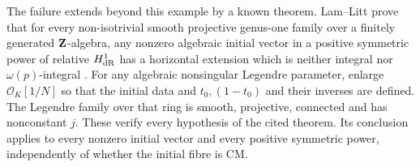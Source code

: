 \documentclass[11pt]{article}
\theoremstyle{definition}\newtheorem{definition}[theorem]{Definition}
\theoremstyle{remark}\newtheorem{remark}[theorem]{Remark}
\begin{document}
The failure extends beyond this example by a known theorem. Lam--Litt prove that for every non-isotrivial smooth projective genus-one family over a finitely generated $\mathbf Z$-algebra, any nonzero algebraic initial vector in a positive symmetric power of relative $H^1_{\mathrm{dR}}$ has a horizontal extension which is neither integral nor $\omega(p)$-integral \cite[Theorem 4.1.1, p.~21]{LamLitt}. For any algebraic nonsingular Legendre parameter, enlarge $\mathcal O_K[1/N]$ so that the initial data and $t_0,(1-t_0)$ and their inverses are defined. The Legendre family over that ring is smooth, projective, connected and has nonconstant $j$. These verify every hypothesis of the cited theorem. Its conclusion applies to every nonzero initial vector and every positive symmetric power, independently of whether the initial fibre is CM.
\end{document}
